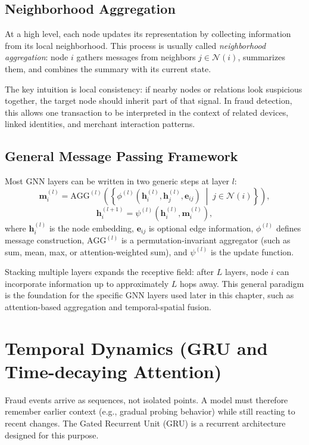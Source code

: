 \documentclass[12pt,a4paper]{report}
\begin{document}
\subsection{Neighborhood Aggregation}
At a high level, each node updates its representation by collecting information from its local neighborhood. This process is usually called \emph{neighborhood aggregation}: node $i$ gathers messages from neighbors $j \in \mathcal{N}(i)$, summarizes them, and combines the summary with its current state.

The key intuition is local consistency: if nearby nodes or relations look suspicious together, the target node should inherit part of that signal. In fraud detection, this allows one transaction to be interpreted in the context of related devices, linked identities, and merchant interaction patterns.

\subsection{General Message Passing Framework}
Most GNN layers can be written in two generic steps at layer $l$:
\begin{equation}
\mathbf{m}_i^{(l)}=
\mathrm{AGG}^{(l)}\left(
\left\{
\phi^{(l)}\!\left(
\mathbf{h}_i^{(l)},\mathbf{h}_j^{(l)},\mathbf{e}_{ij}
\right)
\; \middle|\; j\in\mathcal{N}(i)
\right\}
\right),
\label{eq:general-message-passing-agg}
\end{equation}
\begin{equation}
\mathbf{h}_i^{(l+1)}=
\psi^{(l)}\!\left(\mathbf{h}_i^{(l)},\mathbf{m}_i^{(l)}\right),
\label{eq:general-message-passing-update}
\end{equation}
where $\mathbf{h}_i^{(l)}$ is the node embedding, $\mathbf{e}_{ij}$ is optional edge information, $\phi^{(l)}$ defines message construction, $\mathrm{AGG}^{(l)}$ is a permutation-invariant aggregator (such as sum, mean, max, or attention-weighted sum), and $\psi^{(l)}$ is the update function.

Stacking multiple layers expands the receptive field: after $L$ layers, node $i$ can incorporate information up to approximately $L$ hops away. This general paradigm is the foundation for the specific GNN layers used later in this chapter, such as attention-based aggregation and temporal-spatial fusion.

\section{Temporal Dynamics (GRU and Time-decaying Attention)}
Fraud events arrive as sequences, not isolated points. A model must therefore remember earlier context (e.g., gradual probing behavior) while still reacting to recent changes. The Gated Recurrent Unit (GRU) is a recurrent architecture designed for this purpose.
\end{document}
